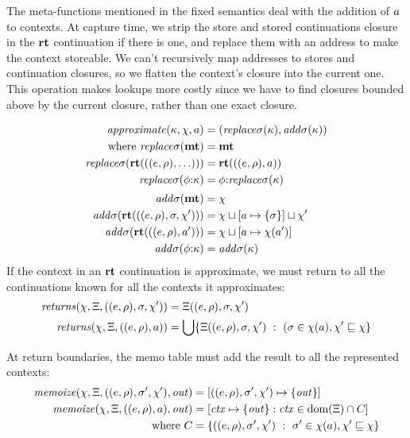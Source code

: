 The meta-functions mentioned in the fixed semantics deal with the addition of $a$ to contexts.
%
At capture time, we strip the store and stored continuations closure in the $\mathbf{rt}$ continuation if there is one, and replace them with an address to make the context storeable.
%
We can't recursively map addresses to stores and continuation closures, so we flatten the context's closure into the current one.
%
This operation makes lookups more costly since we have to find closures bounded above by the current closure, rather than one exact closure.

\newcommand{\replacectx}{\mathit{replace}\mstore}
\newcommand{\addstore}{\mathit{add}\mstore}
\begin{align*}
  \approximate(\mkont, \mmktab, \maddr) &= (\replacectx(\mkont), \addstore(\mkont)) \\
  \text{where }
   \replacectx(\kmt) &= \kmt \\
   \replacectx(\krt{((\mexpr,\menv),\ldots)}) &= \krt{((\mexpr,\menv),\maddr)} \\
   \replacectx(\kcons{\mkframe}{\mkont}) &= \kcons{\mkframe}{\replacectx(\mkont)}
  \\[2pt]
   \addstore(\kmt) &= \mmktab \\
   \addstore(\krt{((\mexpr,\menv),\mstore,\mmktab')}) &= \joinone{\mmktab}{\maddr}{\mstore}\sqcup \mmktab' \\
   \addstore(\krt{((\mexpr,\menv),\maddr')}) &= \joinm{\mmktab}{\maddr}{\mmktab(\maddr')} \\
   \addstore(\kcons{\mkframe}{\mkont}) &= \addstore(\mkont)
\end{align*}
%
If the context in an $\mathbf{rt}$ continuation is approximate, we must return to all the continuations known for all the contexts it approximates:
\begin{align*}
  \mathit{returns}(\chi, \Xi, ((e,\rho), \sigma, \chi')) &= \Xi((e,\rho), \sigma, \chi') \\
  \mathit{returns}(\chi, \Xi, ((e,\rho), a)) &=
    \bigcup\{ \Xi((e,\rho),\sigma,\chi')\ :\ (\sigma \in \chi(a), \chi' \sqsubseteq \chi\}
\end{align*}

At return boundaries, the memo table must add the result to all the represented contexts:
\begin{align*}
  \mathit{memoize}(\chi, \Xi, ((e,\rho), \sigma', \chi'), \mathit{out}) &=
  [((e,\rho), \sigma',\chi') \mapsto \{ {\mathit{out}} \}] \\
  \mathit{memoize}(\chi, \Xi, ((e,\rho), a), \mathit{out}) &= [\mathit{ctx} \mapsto \{ \mathit{out} \} : \mathit{ctx} \in \text{dom}(\Xi) \cap C] \\
    \text{where } C &= \{ ((e,\rho), \sigma', \chi')\ :\ \sigma' \in \chi(a), \chi' \sqsubseteq \chi\}
\end{align*}

